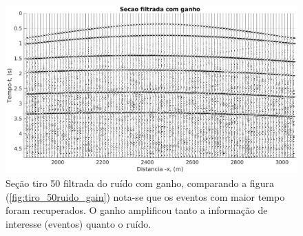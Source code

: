 \begin{landscape}
\begin{figure}[H]
\centering
\includegraphics[totalheight=14cm]{figuras/cap3/secao_filtrada_gain.eps}
\caption{Seção tiro 50 filtrada do ruído com ganho, comparando a figura (\ref{fig:tiro_50ruido_gain}) nota-se que os eventos com maior tempo foram recuperados. O ganho amplificou tanto a informação de interesse (eventos) quanto o ruído.}
\label{fig:secao_filtrada_gain}
\end{figure}
\end{landscape}